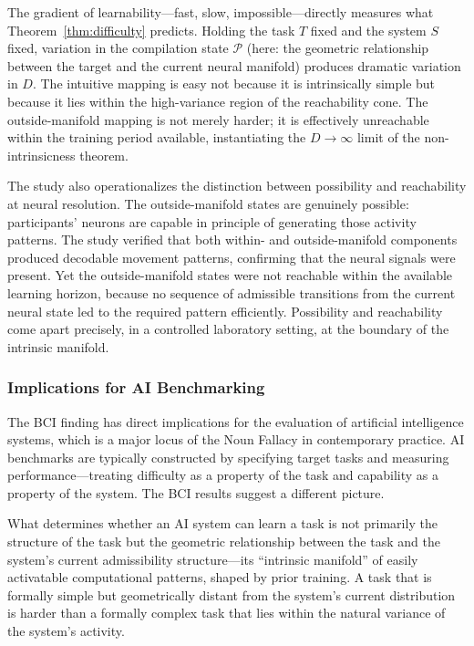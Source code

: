 \documentclass[12pt, a4paper]{article}
\theoremstyle{plain}
\theoremstyle{definition}
\theoremstyle{remark}
\begin{document}
The gradient of learnability---fast, slow, impossible---directly measures
what Theorem~\ref{thm:difficulty} predicts. Holding the task $T$ fixed
and the system $S$ fixed, variation in the compilation state $\mathcal{P}$
(here: the geometric relationship between the target and the current
neural manifold) produces dramatic variation in $D$. The intuitive mapping
is easy not because it is intrinsically simple but because it lies within
the high-variance region of the reachability cone. The outside-manifold
mapping is not merely harder; it is effectively unreachable within
the training period available, instantiating the $D \to \infty$ limit
of the non-intrinsicness theorem.

The study also operationalizes the distinction between
possibility and reachability at neural resolution. The outside-manifold
states are genuinely possible: participants' neurons are capable in
principle of generating those activity patterns. The study verified that
both within- and outside-manifold components produced decodable movement
patterns, confirming that the neural signals were present. Yet the
outside-manifold states were not reachable within the available learning
horizon, because no sequence of admissible transitions from the current
neural state led to the required pattern efficiently. Possibility and
reachability come apart precisely, in a controlled laboratory setting,
at the boundary of the intrinsic manifold.

\subsubsection*{Implications for AI Benchmarking}

The BCI finding has direct implications for the evaluation of artificial
intelligence systems, which is a major locus of the Noun Fallacy in
contemporary practice. AI benchmarks are typically constructed by
specifying target tasks and measuring performance---treating difficulty
as a property of the task and capability as a property of the system.
The BCI results suggest a different picture.

What determines whether an AI system can learn a task is not primarily
the structure of the task but the geometric relationship between the
task and the system's current admissibility structure---its ``intrinsic
manifold'' of easily activatable computational patterns, shaped by prior
training. A task that is formally simple but geometrically distant from
the system's current distribution is harder than a formally complex task
that lies within the natural variance of the system's activity.
\end{document}
